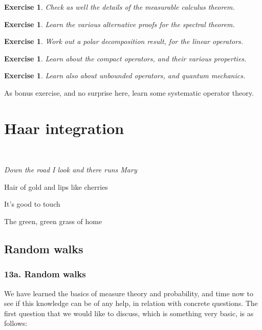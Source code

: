 \documentclass[12pt]{amsbook}
\newtheorem{exercise}[theorem]{Exercise}
\begin{document}
\begin{exercise}
Check as well the details of the measurable calculus theorem.
\end{exercise}

\begin{exercise}
Learn the various alternative proofs for the spectral theorem.
\end{exercise}

\begin{exercise}
Work out a polar decomposition result, for the linear operators.
\end{exercise}

\begin{exercise}
Learn about the compact operators, and their various properties.
\end{exercise}

\begin{exercise}
Learn also about unbounded operators, and quantum mechanics.
\end{exercise}

As bonus exercise, and no surprise here, learn some systematic operator theory.

\part{Haar integration}

\ \vskip50mm

\begin{center}
{\em Down the road I look and there runs Mary

Hair of gold and lips like cherries

It's good to touch

The green, green grass of home}
\end{center}

\chapter{Random walks}

\section*{13a. Random walks}

We have learned the basics of measure theory and probability, and time now to see if this knowledge can be of any help, in relation with concrete questions. The first question that we would like to discuss, which is something very basic, is as follows:
\end{document}
